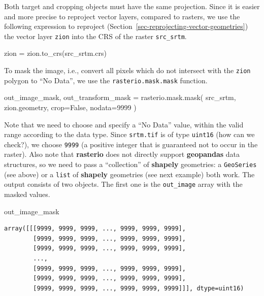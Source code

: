 \documentclass[
  letterpaper,
]{krantz}
\newenvironment{Shaded}{\begin{snugshade}}{\end{snugshade}}
\newcommand{\DecValTok}[1]{\textcolor[rgb]{0.68,0.00,0.00}{#1}}
\newcommand{\NormalTok}[1]{\textcolor[rgb]{0.00,0.23,0.31}{#1}}
\newcommand{\OperatorTok}[1]{\textcolor[rgb]{0.37,0.37,0.37}{#1}}
\newcommand{\VariableTok}[1]{\textcolor[rgb]{0.07,0.07,0.07}{#1}}
\begin{document}
Both target and cropping objects must have the same projection. Since it
is easier and more precise to reproject vector layers, compared to
rasters, we use the following expression to reproject
(Section~\ref{sec-reprojecting-vector-geometries}) the vector layer
\texttt{zion} into the CRS of the raster \texttt{src\_srtm}.

\begin{Shaded}
\begin{Highlighting}[]
\NormalTok{zion }\OperatorTok{=}\NormalTok{ zion.to\_crs(src\_srtm.crs)}
\end{Highlighting}
\end{Shaded}

To mask the image, i.e., convert all pixels which do not intersect with
the \texttt{zion} polygon to ``No Data'', we use the
\texttt{rasterio.mask.mask} function.

\begin{Shaded}
\begin{Highlighting}[]
\NormalTok{out\_image\_mask, out\_transform\_mask }\OperatorTok{=}\NormalTok{ rasterio.mask.mask(}
\NormalTok{    src\_srtm, }
\NormalTok{    zion.geometry, }
\NormalTok{    crop}\OperatorTok{=}\VariableTok{False}\NormalTok{, }
\NormalTok{    nodata}\OperatorTok{=}\DecValTok{9999}
\NormalTok{)}
\end{Highlighting}
\end{Shaded}

Note that we need to choose and specify a ``No Data'' value, within the
valid range according to the data type. Since \texttt{srtm.tif} is of
type \texttt{uint16} (how can we check?), we choose \texttt{9999} (a
positive integer that is guaranteed not to occur in the raster). Also
note that \textbf{rasterio} does not directly support \textbf{geopandas}
data structures, so we need to pass a ``collection'' of \textbf{shapely}
geometries: a \texttt{GeoSeries} (see above) or a \texttt{list} of
\textbf{shapely} geometries (see next example) both work. The output
consists of two objects. The first one is the \texttt{out\_image} array
with the masked values.

\begin{Shaded}
\begin{Highlighting}[]
\NormalTok{out\_image\_mask}
\end{Highlighting}
\end{Shaded}

\begin{verbatim}
array([[[9999, 9999, 9999, ..., 9999, 9999, 9999],
        [9999, 9999, 9999, ..., 9999, 9999, 9999],
        [9999, 9999, 9999, ..., 9999, 9999, 9999],
        ...,
        [9999, 9999, 9999, ..., 9999, 9999, 9999],
        [9999, 9999, 9999, ..., 9999, 9999, 9999],
        [9999, 9999, 9999, ..., 9999, 9999, 9999]]], dtype=uint16)
\end{verbatim}
\end{document}
